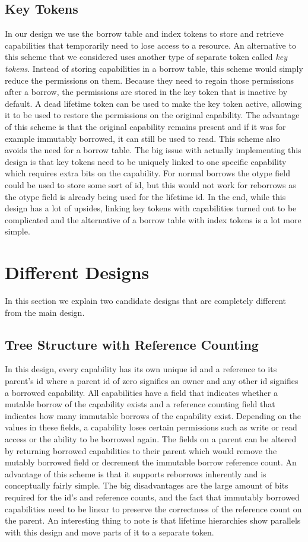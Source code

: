 \subsection{Key Tokens}
In our design we use the borrow table and index tokens to store and retrieve capabilities that temporarily need to lose access to a resource.
An alternative to this scheme that we considered uses another type of separate token called \textit{key tokens}.
Instead of storing capabilities in a borrow table, this scheme would simply reduce the permissions on them.
Because they need to regain those permissions after a borrow, the permissions are stored in the key token that is inactive by default.
A dead lifetime token can be used to make the key token active, allowing it to be used to restore the permissions on the original capability.
The advantage of this scheme is that the original capability remains present and if it was for example immutably borrowed, it can still be used to read.
This scheme also avoids the need for a borrow table.
The big issue with actually implementing this design is that key tokens need to be uniquely linked to one specific capability which requires extra bits on the capability.
For normal borrows the otype field could be used to store some sort of id, but this would not work for reborrows as the otype field is already being used for the lifetime id.
In the end, while this design has a lot of upsides, linking key tokens with capabilities turned out to be complicated and the alternative of a borrow table with index tokens is a lot more simple.

\section{Different Designs}
In this section we explain two candidate designs that are completely different from the main design.

\subsection{Tree Structure with Reference Counting}
In this design, every capability has its own unique id and a reference to its parent's id where a parent id of zero signifies an owner and any other id signifies a borrowed capability.
All capabilities have a field that indicates whether a mutable borrow of the capability exists and a reference counting field that indicates how many immutable borrows of the capability exist.
Depending on the values in these fields, a capability loses certain permissions such as write or read access or the ability to be borrowed again.
The fields on a parent can be altered by returning borrowed capabilities to their parent which would remove the mutably borrowed field or decrement the immutable borrow reference count.
An advantage of this scheme is that it supports reborrows inherently and is conceptually fairly simple.
The big disadvantages are the large amount of bits required for the id's and reference counts, and the fact that immutably borrowed capabilities need to be linear to preserve the correctness of the reference count on the parent.
An interesting thing to note is that lifetime hierarchies show parallels with this design and move parts of it to a separate token.

